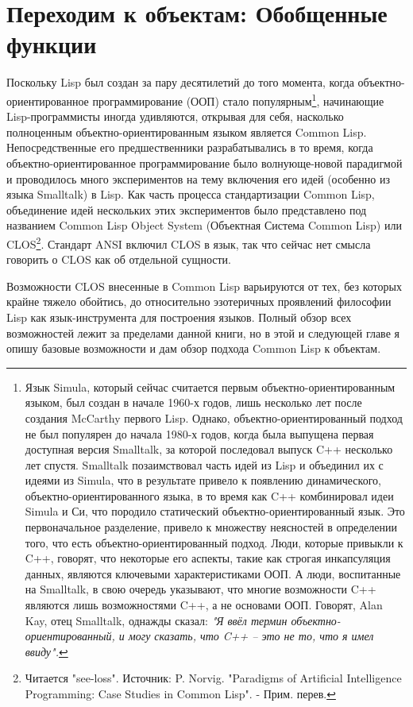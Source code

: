 \chapter{Переходим к объектам: Обобщенные функции}
\label{ch:16}

Поскольку Lisp был создан за пару десятилетий до того момента, когда
объектно-ориентированное программирование (ООП) стало популярным\footnote{Язык Simula,
  который сейчас считается первым объектно-ориентированным языком, был создан в начале
  1960-х годов, лишь несколько лет после создания McCarthy первого Lisp.  Однако,
  объектно-ориентированный подход не был популярен до начала 1980-х годов, когда была
  выпущена первая доступная версия Smalltalk, за которой последовал выпуск C++ несколько
  лет спустя.  Smalltalk позаимствовал часть идей из Lisp и объединил их с идеями из
  Simula, что в результате привело к появлению динамического, объектно-ориентированного
  языка, в то время как C++ комбинировал идеи Simula и Си, что породило статический
  объектно-ориентированный язык. Это первоначальное разделение, привело к множеству
  неясностей в определении того, что есть объектно-ориентированный подход.  Люди, которые
  привыкли к C++, говорят, что некоторые его аспекты, такие как строгая инкапсуляция
  данных, являются ключевыми характеристиками ООП. А люди, воспитанные на Smalltalk, в
  свою очередь указывают, что многие возможности C++ являются лишь возможностями C++, а не
  основами ООП.  Говорят, Alan Kay, отец Smalltalk, однажды сказал: \textit{"Я ввёл термин
    объектно-ориентированный, и могу сказать, что C++ -- это не то, что я имел ввиду".}},
начинающие Lisp-программисты иногда удивляются, открывая для себя, насколько полноценным
объектно-ориентированным языком является Common Lisp.  Непосредственные его
предшественники разрабатывались в то время, когда объектно-ориентированное
программирование было волнующе-новой парадигмой и проводилось много экспериментов на тему
включения его идей (особенно из языка Smalltalk) в Lisp.  Как часть процесса
стандартизации Common Lisp, объединение идей нескольких этих экспериментов было
представлено под названием Common Lisp Object System (Объектная Система Common Lisp) или
CLOS\footnote{Читается "see-loss". Источник: P. Norvig. "Paradigms of Artificial
  Intelligence Programming: Case Studies in Common Lisp". - Прим. перев.}. Стандарт ANSI
включил CLOS в язык, так что сейчас нет смысла говорить о CLOS как об отдельной сущности.

Возможности CLOS внесенные в Common Lisp варьируются от тех, без которых крайне тяжело
обойтись, до относительно эзотеричных проявлений философии Lisp как язык-инструмента для
построения языков.  Полный обзор всех возможностей лежит за пределами данной книги, но в
этой и следующей главе я опишу базовые возможности и дам обзор подхода Common Lisp к
объектам.

